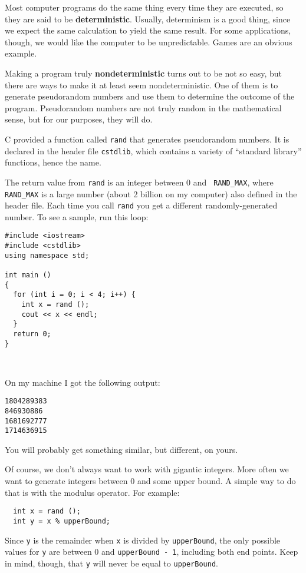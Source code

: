 Most computer programs do the same thing every time they are executed,
so they are said to be {\bf deterministic}.  Usually, determinism is a
good thing, since we expect the same calculation to yield the same
result.  For some applications, though, we would like the
computer to be unpredictable.  Games are an obvious example.

Making a program truly {\bf nondeterministic} turns out to be not
so easy, but there are ways to make it at least seem
nondeterministic.  One of them is to generate {pseudorandom} numbers and
use them to determine the outcome of the program.
Pseudorandom numbers
are not truly random in the mathematical sense, but 
for our purposes, they will do.

C provided a function called {\tt rand} that generates
pseudorandom numbers.  It is declared in the
header file {\tt cstdlib}, which contains a variety of ``standard
library'' functions, hence the name.

The return value from {\tt rand} is an integer between 0 and {\tt
RAND\_MAX}, where {\tt RAND\_MAX} is a large number (about 2 billion
on my computer) also defined in the header file.  Each time you call
{\tt rand} you get a different randomly-generated number.  To see a
sample, run this loop:

\begin{verbatim}
#include <iostream>
#include <cstdlib>
using namespace std;

int main ()
{
  for (int i = 0; i < 4; i++) {
    int x = rand ();
    cout << x << endl;
  }
  return 0;
}

  
\end{verbatim}
%
On my machine I got the following output:

\begin{verbatim}
1804289383
846930886
1681692777
1714636915
\end{verbatim}
%
You will probably get something similar, but different, on yours.

Of course, we don't always want to work with gigantic integers.
More often we want to generate integers between 0 and some
upper bound.  A simple way to do that is with the modulus
operator.  For example:

\begin{verbatim}
  int x = rand ();
  int y = x % upperBound;
\end{verbatim}
%
Since {\tt y} is the remainder when {\tt x} is divided by
{\tt upperBound}, the only possible values for {\tt y}
are between 0 and {\tt upperBound - 1}, including both
end points.  Keep in mind, though, that {\tt y} will never
be equal to {\tt upperBound}.

